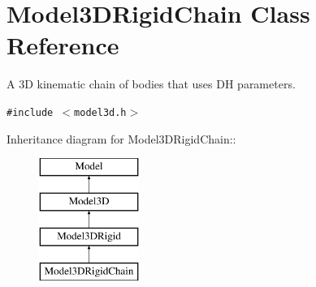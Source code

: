 \section{Model3DRigid\-Chain  Class Reference}
\label{class_Model3DRigidChain}
A 3D kinematic chain of bodies that uses DH parameters. 


{\tt \#include $<$model3d.h$>$}

Inheritance diagram for Model3DRigid\-Chain::\begin{figure}[H]
\begin{center}
\leavevmode
\includegraphics[height=4cm]{class_Model3DRigidChain}
\end{center}
\end{figure}
